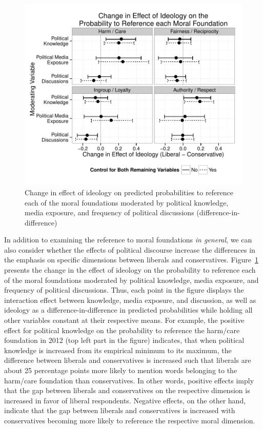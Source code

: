 \documentclass[12pt]{article}
\begin{document}
\begin{figure}\centering
\includegraphics{../calc/fig/fig4ideolearn.pdf}
\caption{Change in effect of ideology on predicted probabilities to reference each of the moral foundations moderated by political knowledge, media exposure, and frequency of political discussions (difference-in-difference)}\label{fig:4ideolearn}
\end{figure}

In addition to examining the reference to moral foundations \textit{in general}, we can also consider whether the effects of political discourse increase the differences in the emphasis on specific dimensions between liberals and conservatives. Figure~\ref{fig:4ideolearn} presents the change in the effect of ideology on the probability to reference each of the moral foundations moderated by political knowledge, media exposure, and frequency of political discussions. Thus, each point in the figure displays the interaction effect between knowledge, media exposure, and discussion, as well as ideology as a difference-in-difference in predicted probabilities while holding all other variables constant at their respective means. For example, the positive effect for political knowledge on the probability to reference the harm/care foundation in 2012 (top left part in the figure) indicates, that when political knowledge is increased from its empirical minimum to its maximum, the difference between liberals and conservatives is increased such that liberals are about 25 percentage points more likely to mention words belonging to the harm/care foundation than conservatives. In other words, positive effects imply that the gap between liberals and conservatives on the respective dimension is increased in favor of liberal respondents. Negative effects, on the other hand, indicate that the gap between liberals and conservatives is increased with conservatives becoming more likely to reference the respective moral dimension.
\end{document}
